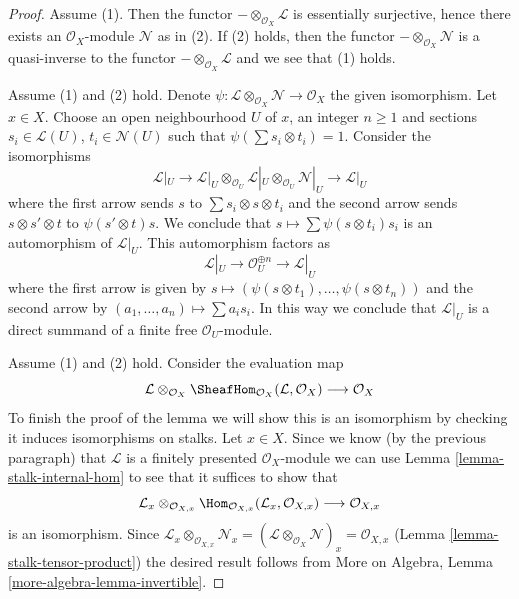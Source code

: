 \begin{proof}
Assume (1). Then the functor $- \otimes_{\mathcal{O}_X} \mathcal{L}$
is essentially surjective, hence there exists an $\mathcal{O}_X$-module
$\mathcal{N}$ as in (2). If (2) holds, then the functor
$- \otimes_{\mathcal{O}_X} \mathcal{N}$ is a quasi-inverse
to the functor $- \otimes_{\mathcal{O}_X} \mathcal{L}$ and
we see that (1) holds.

\medskip\noindent
Assume (1) and (2) hold. Denote
$\psi : \mathcal{L} \otimes_{\mathcal{O}_X} \mathcal{N} \to \mathcal{O}_X$
the given isomorphism. Let $x \in X$. Choose an open neighbourhood
$U$ of $x$, an integer $n \geq 1$ and sections $s_i \in \mathcal{L}(U)$,
$t_i \in \mathcal{N}(U)$ such that $\psi(\sum s_i \otimes t_i) = 1$.
Consider the isomorphisms
$$
\mathcal{L}|_U \to
\mathcal{L}|_U \otimes_{\mathcal{O}_U}
\mathcal{L}|_U \otimes_{\mathcal{O}_U} \mathcal{N}|_U \to \mathcal{L}|_U
$$
where the first arrow sends $s$ to $\sum s_i \otimes s \otimes t_i$
and the second arrow sends $s \otimes s' \otimes t$ to $\psi(s' \otimes t)s$.
We conclude that $s \mapsto \sum \psi(s \otimes t_i)s_i$ is
an automorphism of $\mathcal{L}|_U$. This automorphism factors as
$$
\mathcal{L}|_U \to \mathcal{O}_U^{\oplus n} \to \mathcal{L}|_U
$$
where the first arrow is given by
$s \mapsto (\psi(s \otimes t_1), \ldots, \psi(s \otimes t_n))$
and the second arrow by $(a_1, \ldots, a_n) \mapsto \sum a_i s_i$.
In this way we conclude that $\mathcal{L}|_U$ is a direct summand
of a finite free $\mathcal{O}_U$-module.

\medskip\noindent
Assume (1) and (2) hold. Consider the evaluation map
$$
\mathcal{L} \otimes_{\mathcal{O}_X}
\SheafHom_{\mathcal{O}_X}(\mathcal{L}, \mathcal{O}_X)
\longrightarrow \mathcal{O}_X
$$
To finish the proof of the lemma
we will show this is an isomorphism by checking it induces
isomorphisms on stalks. Let $x \in X$.
Since we know (by the previous paragraph)
that $\mathcal{L}$ is a finitely presented
$\mathcal{O}_X$-module
we can use Lemma \ref{lemma-stalk-internal-hom}
to see that it suffices to show that
$$
\mathcal{L}_x \otimes_{\mathcal{O}_{X, x}}
\Hom_{\mathcal{O}_{X, x}}(\mathcal{L}_x, \mathcal{O}_{X, x})
\longrightarrow \mathcal{O}_{X, x}
$$
is an isomorphism. Since
$\mathcal{L}_x \otimes_{\mathcal{O}_{X, x}} \mathcal{N}_x =
(\mathcal{L} \otimes_{\mathcal{O}_X} \mathcal{N})_x =
\mathcal{O}_{X, x}$ (Lemma \ref{lemma-stalk-tensor-product})
the desired result follows from
More on Algebra, Lemma \ref{more-algebra-lemma-invertible}.
\end{proof}

